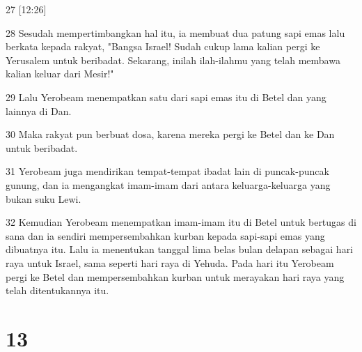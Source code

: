 \par 27 [12:26]
\par 28 Sesudah mempertimbangkan hal itu, ia membuat dua patung sapi emas lalu berkata kepada rakyat, "Bangsa Israel! Sudah cukup lama kalian pergi ke Yerusalem untuk beribadat. Sekarang, inilah ilah-ilahmu yang telah membawa kalian keluar dari Mesir!"
\par 29 Lalu Yerobeam menempatkan satu dari sapi emas itu di Betel dan yang lainnya di Dan.
\par 30 Maka rakyat pun berbuat dosa, karena mereka pergi ke Betel dan ke Dan untuk beribadat.
\par 31 Yerobeam juga mendirikan tempat-tempat ibadat lain di puncak-puncak gunung, dan ia mengangkat imam-imam dari antara keluarga-keluarga yang bukan suku Lewi.
\par 32 Kemudian Yerobeam menempatkan imam-imam itu di Betel untuk bertugas di sana dan ia sendiri mempersembahkan kurban kepada sapi-sapi emas yang dibuatnya itu. Lalu ia menentukan tanggal lima belas bulan delapan sebagai hari raya untuk Israel, sama seperti hari raya di Yehuda. Pada hari itu Yerobeam pergi ke Betel dan mempersembahkan kurban untuk merayakan hari raya yang telah ditentukannya itu.

\chapter{13}

